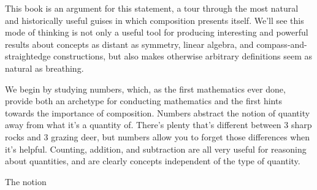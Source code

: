 \documentclass{book}
\begin{document}
This book is an argument for this statement, a tour through the most natural and historically useful guises in which composition presents itself.
We'll see this mode of thinking is not only a useful tool for producing interesting and powerful results about concepts as distant as
symmetry, linear algebra, and compass-and-straightedge constructions, but also makes otherwise arbitrary definitions seem as natural as breathing.

We begin by studying numbers, which, as the first mathematics ever done, provide both an archetype for conducting mathematics
and the first hints towards the importance of composition.
Numbers abstract the notion of quantity away from what it's a quantity of.
There's plenty that's different between 3 sharp rocks and 3 grazing deer, but numbers allow you to forget those differences when it's helpful.
Counting, addition, and subtraction are all very useful for reasoning about quantities,
and are clearly concepts independent of the type of quantity.
\begin{center}
\end{center}
The notion
\end{document}
